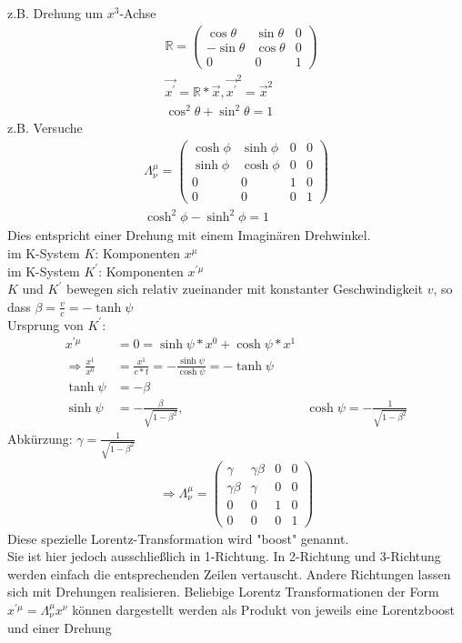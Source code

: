 \documentclass[a4paper]{article}
\begin{document}
z.B. Drehung um $x^3$-Achse
\begin{align}
&\mathbb{R}=\begin{pmatrix} \cos\theta & \sin\theta & 0 \\ -\sin\theta
& \cos\theta &0 \\ 0&0&1\end{pmatrix}\\
&\vec{x^{'}}= \mathbb{R}*\vec{x},\vec{x^{'}}^2= \vec{x}^2\\
&\cos^2\theta+\sin^2\theta=1
\end{align}
z.B. Versuche
\begin{align}
\Lambda^\mu_\nu= \begin{pmatrix} \cosh\phi & \sinh\phi& 0&0\\ \sinh\phi&\cosh\phi
&0&0\\0&0 &1&0 \\0&0 &0&1 \end{pmatrix}\\
\cosh^2\phi - \sinh^2\phi=1
\end{align}
Dies entspricht einer Drehung mit einem Imaginären Drehwinkel.\\
im K-System $K$: Komponenten $x^\mu$\\
im K-System $K^{'}$: Komponenten $x^{'\mu}$\\
$K$ und $K^{'}$ bewegen sich relativ zueinander mit konstanter Geschwindigkeit
$v$, so dass $\beta=\frac{v}{c}=-\tanh\psi$\\
Ursprung von $K^{'}$: 
\begin{align}
x^{'\mu}&=0=\sinh\psi*x^0+\cosh\psi*x^1\\
\Rightarrow
\frac{x^1}{x^0}&=\frac{x^1}{c*t}=-\frac{\sinh\psi}{\cosh\psi}=-\tanh\psi\\
\tanh\psi&=-\beta \\
\sinh\psi&=-\frac{\beta}{\sqrt{1-\beta^2}}, &
\cosh\psi=-\frac{1}{\sqrt{1-\beta^2}}
\end{align}
Abkürzung: $\gamma=\frac{1}{\sqrt{1-\beta^2}}$
\begin{align}
\Rightarrow \Lambda^\mu_\nu= \begin{pmatrix} \gamma & \gamma \beta & 0&0\\
\gamma \beta & \gamma &0&0\\0&0 &1&0 \\0&0 &0&1 \end{pmatrix}
\end{align}
Diese spezielle Lorentz-Transformation wird "boost" genannt.\\
Sie ist hier jedoch ausschließlich in 1-Richtung. In 2-Richtung und 3-Richtung
werden einfach die entsprechenden Zeilen vertauscht. Andere Richtungen lassen
sich mit Drehungen realisieren. Beliebige Lorentz Transformationen der Form
$x^{'\mu}=\Lambda^\mu_\nu x^\nu$ können dargestellt werden als Produkt von
jeweils eine Lorentzboost und einer Drehung
\end{document}

